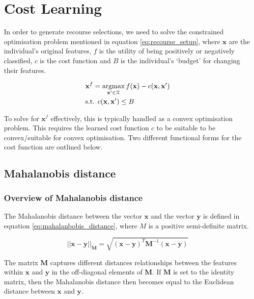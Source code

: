 \chapter{Cost Learning}

In order to generate recourse selections, we need to solve the constrained optimisation problem mentioned in equation \ref{eq:recourse_setup}, where $\mathbf{x}$ are the individual's original features, $f$ is the utility of being positively or negatively classified, $c$ is the cost function and $B$ is the individual's `budget' for changing their features.

\begin{align}
	& \mathbf{x}^f = \operatorname*{argmax}_{\mathbf{x}' \in \mathbf{\mathcal{X}}} f(\mathbf{x}) - c(\mathbf{x}, \mathbf{x}') \\
	& \text{s.t. } c(\mathbf{x}, \mathbf{x}') \leq B \nonumber
\end{align}

To solve for $\mathbf{x}^f$ effectively, this is typically handled as a convex optimisation problem. This requires the learned cost function $c$ to be suitable to be convex/suitable for convex optimisation. Two different functional forms for the cost function are outlined below.


\section{Mahalanobis distance}

\subsection{Overview of Mahalanobis distance}

The Mahalanobis distance between the vector $\mathbf{x}$ and the vector $\mathbf{y}$ is defined in equation \ref{eq:mahalanbobis_distance}, where $M$ is a positive semi-definite matrix.

\begin{equation} \label{eq:mahalanbobis_distance}
	||\mathbf{x-y}||_{\mathbf{M}} = \sqrt{(\mathbf{x-y})^T\mathbf{M}^{-1}(\mathbf{x-y})}
\end{equation}

The matrix $\mathbf{M}$ captures different distances relationships between the features within $\mathbf{x}$ and $\mathbf{y}$ in the off-diagonal elements of $\mathbf{M}$. If $\mathbf{M}$ is set to the identity matrix, then the Mahalanobis distance then becomes equal to the Euclidean distance between $\mathbf{x}$ and $\mathbf{y}$. \\

